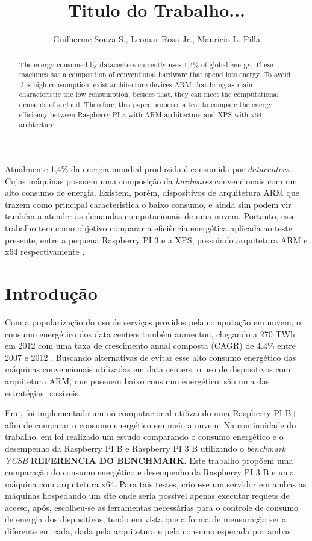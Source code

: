 \documentclass[12pt]{article}
\title{Titulo do Trabalho...}
\author{Guilherme Souza S.\inst{1}, Leomar Rosa Jr.\inst{1}, Mauricio L. Pilla\inst{1} }
\begin{document}
 
\maketitle

\begin{abstract}
  The energy consumed by datacenters currently uses 1,4\% of global energy. %
  These machines has a composition of conventional hardware that spend lots energy. 
  To avoid this high consumption, exist architecture devices ARM that bring as main characteristic the low consumption, besides that, they can meet the computational demands of a cloud. 
  Therefore, this paper proposes a test to compare the energy efficiency between Raspberry PI 3 with ARM architecture and XPS with x64 archtecture. 
\end{abstract}
     
\begin{resumo} 
  Atualmente 1,4\% da energia mundial produzida é consumida por \textit{datacenters}. Cujas máquinas possuem uma composição da \textit{hardwares} convencionais com um alto consumo de energia. Existem, porém, dispositivos de arquitetura ARM que trazem como principal caracteristica o baixo consumo, e ainda sim podem vir também a atender as demandas computacionais de uma nuvem. Portanto, esse trabalho tem como objetivo comparar a eficiência energética aplicada ao teste presente, entre a pequena Raspberry PI 3 e a XPS, possuindo arquitetura ARM e x64 respectivamente .
\end{resumo}


\section{Introdução}
  Com a popularização do uso de serviços providos pela computação em nuvem, o consumo energético dos data centers também aumentou, chegando a 270 TWh em 2012 com uma taxa de crescimento anual composta (CAGR) de 4.4\% entre 2007 e 2012 \cite{VanHeddeghem:2014:TWI:2657027.2657141}. Buscando alternativas de evitar esse alto consumo energético das máquinas convencionais utilizadas em data centers, o uso de dispositivos com arquitetura ARM, que possuem baixo consumo energético, são uma das estratégias possíveis.


  Em \cite{Joao}, foi implementado um nó computacional utilizando uma Raspberry PI B+ afim de comparar o consumo energético em meio a nuvem.
  Na continuidade do trabalho, em \cite{eu} foi realizado um estudo comparando o consumo energético e o desempenho da Raspberry PI B e Raspberry PI 3 B utilizando o \textit{benchmark YCSB}  \textbf{REFERENCIA DO BENCHMARK}. %
  Este trabalho propõem uma comparação do consumo energético e desempenho da Raspberry PI 3 B e uma máquina com arquitetura x64. Para tais testes, criou-se um servidor em ambas as máquinas hospedando um site onde seria possível apenas executar requets de acesso, após, escolheu-se as ferramentas necessárias para o controle de consumo de energia dos dispositivos, tendo em vista que a forma de mensuração seria diferente em cada, dada pela arquitetura e pelo consumo esperada por ambas.
\end{document}
